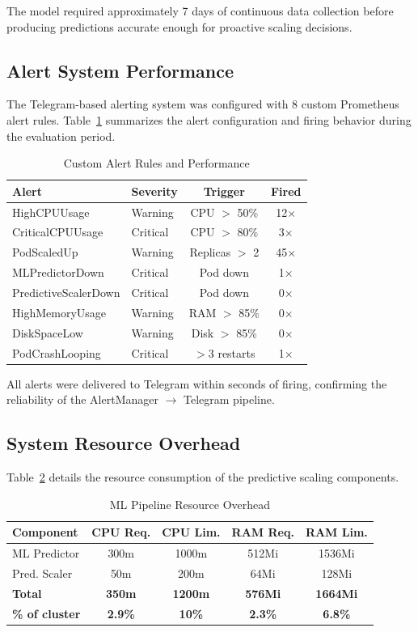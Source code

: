 \documentclass[journal]{IEEEtran}
\begin{document}
The model required approximately 7 days of continuous data collection before producing predictions accurate enough for proactive scaling decisions.

\subsection{Alert System Performance}
The Telegram-based alerting system was configured with 8 custom Prometheus alert rules. Table~\ref{tab:alerts} summarizes the alert configuration and firing behavior during the evaluation period.

\begin{table}[h]
\centering
\caption{Custom Alert Rules and Performance}
\label{tab:alerts}
\begin{tabular}{@{}llcc@{}}
\toprule
\textbf{Alert} & \textbf{Severity} & \textbf{Trigger} & \textbf{Fired} \\
\midrule
HighCPUUsage & Warning & CPU $>$ 50\% & 12$\times$ \\
CriticalCPUUsage & Critical & CPU $>$ 80\% & 3$\times$ \\
PodScaledUp & Warning & Replicas $>$ 2 & 45$\times$ \\
MLPredictorDown & Critical & Pod down & 1$\times$ \\
PredictiveScalerDown & Critical & Pod down & 0$\times$ \\
HighMemoryUsage & Warning & RAM $>$ 85\% & 0$\times$ \\
DiskSpaceLow & Warning & Disk $>$ 85\% & 0$\times$ \\
PodCrashLooping & Critical & $>$3 restarts & 1$\times$ \\
\bottomrule
\end{tabular}
\end{table}

All alerts were delivered to Telegram within seconds of firing, confirming the reliability of the AlertManager $\rightarrow$ Telegram pipeline.

\subsection{System Resource Overhead}
Table~\ref{tab:overhead} details the resource consumption of the predictive scaling components.

\begin{table}[h]
\centering
\caption{ML Pipeline Resource Overhead}
\label{tab:overhead}
\begin{tabular}{@{}lcccc@{}}
\toprule
\textbf{Component} & \textbf{CPU Req.} & \textbf{CPU Lim.} & \textbf{RAM Req.} & \textbf{RAM Lim.} \\
\midrule
ML Predictor & 300m & 1000m & 512Mi & 1536Mi \\
Pred. Scaler & 50m & 200m & 64Mi & 128Mi \\
\midrule
\textbf{Total} & \textbf{350m} & \textbf{1200m} & \textbf{576Mi} & \textbf{1664Mi} \\
\textbf{\% of cluster} & \textbf{2.9\%} & \textbf{10\%} & \textbf{2.3\%} & \textbf{6.8\%} \\
\bottomrule
\end{tabular}
\end{table}
\end{document}
